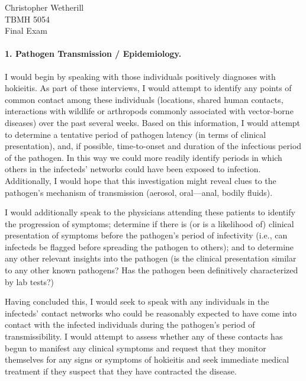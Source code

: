 \documentclass[11pt,letterpaper,final] {article}
\begin{document}

\noindent Christopher Wetherill\\
TBMH 5054\\
Final Exam

\paragraph{1. Pathogen Transmission / Epidemiology.} I would begin by speaking with those individuals positively diagnoses with hokieitis. As part of these interviews, I would attempt to identify any points of common contact among these individuals (locations, shared human contacts, interactions with wildlife or arthropods commonly associated with vector-borne diseases) over the past several weeks. Based on this information, I would attempt to determine a tentative period of pathogen latency (in terms of clinical presentation), and, if possible, time-to-onset and duration of the infectious period of the pathogen. In this way we could more readily identify periods in which others in the infecteds' networks could have been exposed to infection. Additionally, I would hope that this investigation might reveal clues to the pathogen's mechanism of transmission (aerosol, oral---anal, bodily fluids).

I would additionally speak to the physicians attending these patients to identify the progression of symptoms; determine if there is (or is a likelihood of) clinical presentation of symptoms before the pathogen's period of infectivity (i.e., can infecteds be flagged before spreading the pathogen to others); and to determine any other relevant insights into the pathogen (is the clinical presentation similar to any other known pathogens? Has the pathogen been definitively characterized by lab tests?)

Having concluded this, I would seek to speak with any individuals in the infecteds' contact networks who could be reasonably expected to have come into contact with the infected individuals during the pathogen's period of transmissibility. I would attempt to assess whether any of these contacts has begun to manifest any clinical symptoms and request that they monitor themselves for any signs or symptoms of hokieitis and seek immediate medical treatment if they suspect that they have contracted the disease.
\end{document}
